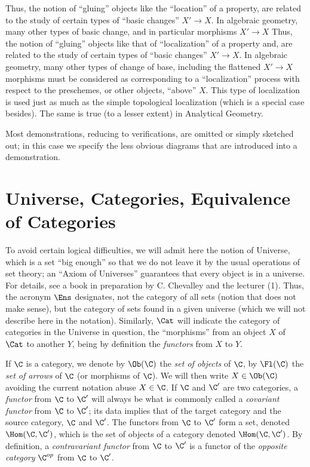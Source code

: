 Thus, the notion of ``gluing'' objects like the ``location'' of a property, are related to the study of certain types of ``basic changes'' $X '\to X$. 
In algebraic geometry, many other types of basic change, and in particular morphisms $X '\to X$ Thus, the notion of ``gluing'' objects like that of ``localization'' of a property and, are related to the study of certain types of ``basic changes'' $X '\to X$. 
In algebraic geometry, many other types of change of base, including the flattened $X '\to X$ morphisms must be considered as corresponding to a ``localization'' process with respect to the preschemes, or other objects, ``above'' $X$. This type of localization is used just as much as the simple topological localization (which is a special case besides). 
The same is true (to a lesser extent) in Analytical Geometry. 

Most demonstrations, reducing to verifications, are omitted or simply sketched out; in this case we specify the less obvious diagrams that are introduced into a demonstration.

\section{Universe, Categories, Equivalence of Categories}

To avoid certain logical difficulties, we will admit here the notion of Universe, which is a set ``big enough'' so that we do not leave it by the usual operations of set theory; an ``Axiom of Universes'' guarantees that every object is in a universe. 
For details, see a book in preparation by C. Chevalley and the lecturer (1). 
Thus, the acronym $\Ens$ designates, not the category of all sets (notion that does not make sense), but the category of sets found in a given universe (which we will not describe here in the notation). 
Similarly, $\Cat$ will indicate the category of categories in the Universe in question,
the ``morphisms'' from an object $X$ of $\Cat$ to another $Y$, being by definition the \emph{functors} from $X$ to $Y$.

If $\C$ is a category, we denote by $\Ob (\C)$ the \emph{set of objects} of $\C$, by $\Fl (\C)$ the \emph{set of arrows} of $\C$ (or morphisms of $\C$). 
We will then write $X \in \Ob (\C)$ avoiding the current notation abuse $X \in \C$. 
If $\C$ and $\C'$ are two categories, a \emph{functor} from $\C$ to $\C'$ will always be what is commonly called a \emph{covariant functor} from $\C$ to $\C'$; its data implies that of the target category and the source category, $\C$ and $\C'$. The functors from $\C$ to $\C'$ form a set, denoted $\Hom (\C, \C')$, which is the set of objects of a category denoted $\Hom (\C, \C')$.
By definition, a \emph{contravariant functor} from $\C$ to $\C'$ is a functor of the \emph{opposite category} $\C^{op}$ from $\C$ to $\C'$.

